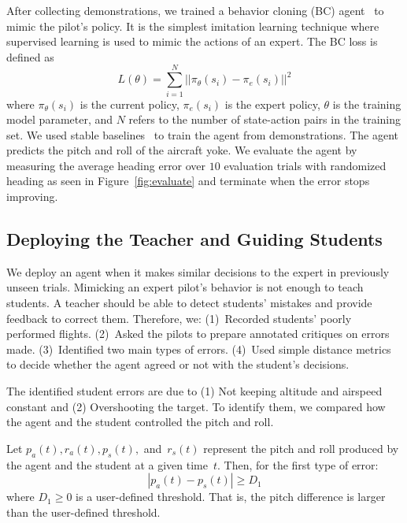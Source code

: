 \documentclass[letterpaper]{article}
\begin{document}
After collecting demonstrations, we trained a behavior cloning (BC) agent~\cite{pomerleau1988alvinn} to mimic the pilot's policy. It is the simplest imitation learning technique where supervised learning is used to mimic the actions of an expert. The BC loss is defined as
\begin{equation}
   L(\theta)=\sum_{i=1}^{N}||\pi_{\theta}(s_i)-\pi_e(s_i)||^2
   \label{bc_loss}
\end{equation}
where $\pi_{\theta}(s_i)$ is the current policy, $\pi_e(s_i)$ is the expert policy, $\theta$ is the training model parameter, and $N$ refers to the number of state-action pairs in the training set. We used stable baselines~\cite{stable-baselines3} to train the agent from demonstrations. The agent predicts the pitch and roll of the aircraft yoke. We evaluate the agent by measuring the average heading error over $10$ evaluation trials with randomized heading as seen in Figure~\ref{fig:evaluate} and terminate when the error stops improving.



\subsection{Deploying the Teacher and Guiding Students}

We deploy an agent when it makes similar decisions to the expert in previously unseen trials. Mimicking an expert pilot's behavior is not enough to teach students. A teacher should be able to detect students' mistakes and provide feedback to correct them. Therefore, we: (1)~Recorded students' poorly performed flights. (2)~Asked the pilots to prepare annotated critiques on errors made. (3)~Identified two main types of errors. (4)~Used simple distance metrics to decide whether the agent agreed or not with the student's decisions.

The identified student errors are due to (1) Not keeping altitude and airspeed constant and (2) Overshooting the target. To identify them, we compared how the agent and the student controlled the pitch and roll.

Let $p_a(t), r_a(t), p_s(t),$ and~$r_s(t)$ represent the pitch and roll produced by the agent and the student at a given time~$t$. Then, for the first type of error:
\begin{equation}
  |p_a(t) - p_s(t)| \ge D_1
  \label{eq_error1}
\end{equation}
where $D_1 \ge 0$ is a user-defined threshold. That is, the pitch difference is larger than the user-defined threshold.
\end{document}
